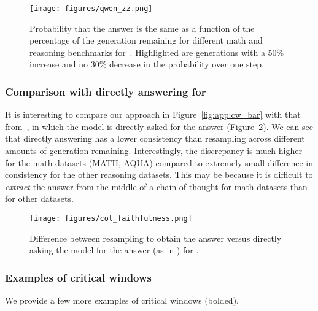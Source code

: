 \begin{figure}[H] 
    \centering
    \texttt{[image: figures/qwen\_zz.png]}
    \caption{Probability that the answer is the same as a function of the percentage of the generation remaining for different math and reasoning benchmarks for~\qweninstruct. Highlighted are generations with a 50\% increase and no 30\% decrease in the probability over one step. }
    \label{fig:app:qwen_cw_benchmark}
\end{figure}





\subsubsection{Comparison with directly answering for~\llamainstruct}
It is interesting to compare our approach in Figure~\ref{fig:app:cw_bar} with that from~\cite{lanham2023measuringfaithfulnesschainofthoughtreasoning}, in which the model is directly asked for the answer (Figure~\ref{fig:app:cot_faithfulness}). We can see that directly answering has a lower consistency than resampling across different amounts of generation remaining. Interestingly, the discrepancy is much higher for the math-datasets (MATH, AQUA) compared to extremely small difference in consistency for the other reasoning datasets. This may be because it is difficult to \emph{extract} the answer from the middle of a chain of thought for math datasets than for other datasets. 

\begin{figure}[H] 
    \centering
    \texttt{[image: figures/cot\_faithfulness.png]}
    \caption{Difference between resampling to obtain the answer versus directly asking the model for the answer (as in \citep{lanham2023measuringfaithfulnesschainofthoughtreasoning}) for \llamainstruct. }
    \label{fig:app:cot_faithfulness}
\end{figure}

\subsubsection{Examples of critical windows}\label{app:eg_critical_cot}
We provide a few more examples of critical windows (bolded). 

